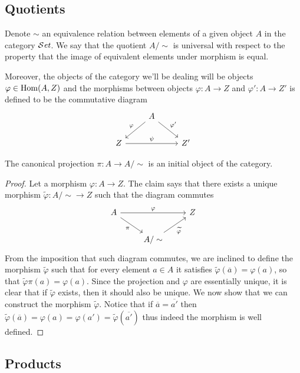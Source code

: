 \subsection{Quotients}

Denote \(\sim\) an equivalence relation between elements of a given object
\(A\) in the category \({\mathcal{S}\textit{et}}\). We say that the quotient \(A/\sim\) is
universal with respect to the property that the image of equivalent elements
under morphism is equal.

Moreover, the objects of the category we'll be dealing will be objects
\(\varphi \in \operatorname{Hom}(A, Z)\) and the morphisms between objects \(\varphi : A \to
Z\) and \(\varphi' : A \to Z'\) is defined to be the commutative diagram
\[
  \begin{tikzcd}
      &A \ar[dl, swap, "\varphi"] \ar[dr, "\varphi'"] & \\
    Z \ar[rr, "\psi"] & &Z'
  \end{tikzcd}
\]

\begin{proposition}
   The canonical projection \(\pi : A \to A/\sim\) is an initial object of the
   category.
\end{proposition}

\begin{proof}
   Let a morphism \(\varphi: A \to Z\). The claim says that there exists a
   unique morphism \(\tilde{\varphi} : A/\sim \to Z\) such that the diagram
   commutes
    \[
      \begin{tikzcd}
        A \ar[rr, "\varphi"] \ar[dr, swap, "\pi"]
          &
            & Z \\
          & A/\sim \ar[ur, swap, "\widetilde \varphi"]
      \end{tikzcd}
   \]
   From the imposition that such diagram commutes, we are inclined to define the
   morphism \(\tilde\varphi\) such that for every element \(a \in A\) it
   satisfies \(\tilde\varphi(\overline{a}) = \varphi(a)\), so that
   \(\tilde\varphi  \pi (a) = \varphi(a)\). Since the projection and
   \(\varphi\) are essentially unique, it is clear that if \(\tilde\varphi\)
   exists, then it should also be unique. We now show that we can construct the
   morphism \(\tilde\varphi\). Notice that if \(\overline{a} = \overline{a'}\)
   then \(\tilde\varphi(\overline{a}) = \varphi(a)= \varphi(a') =
   \tilde\varphi(\overline{a'})\) thus indeed the morphism is well defined.
\end{proof}

\subsection{Products}

